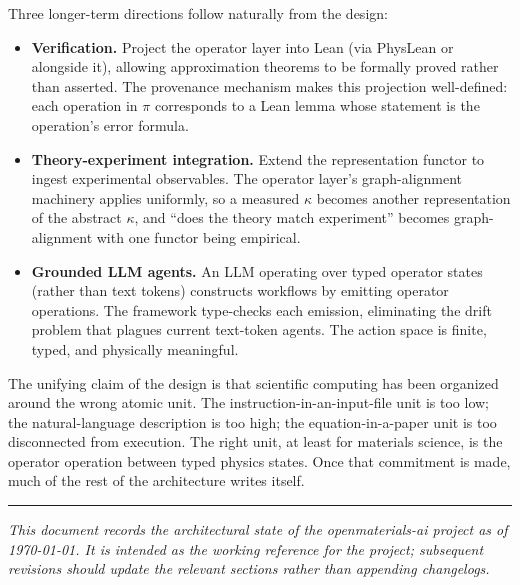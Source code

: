 \documentclass[11pt,a4paper]{article}
\begin{document}
Three longer-term directions follow naturally from the design:

\begin{itemize}[leftmargin=2em]
  \item \textbf{Verification.} Project the operator layer into Lean (via PhysLean or alongside
        it), allowing approximation theorems to be formally proved rather than asserted. The
        provenance mechanism makes this projection well-defined: each operation in $\pi$
        corresponds to a Lean lemma whose statement is the operation's error formula.
  \item \textbf{Theory-experiment integration.} Extend the representation functor to ingest
        experimental observables. The operator layer's graph-alignment machinery applies uniformly,
        so a measured $\kappa$ becomes another representation of the abstract $\kappa$, and
        ``does the theory match experiment'' becomes graph-alignment with one functor being
        empirical.
  \item \textbf{Grounded LLM agents.} An LLM operating over typed operator states (rather than
        text tokens) constructs workflows by emitting operator operations. The framework
        type-checks each emission, eliminating the drift problem that plagues current
        text-token agents. The action space is finite, typed, and physically meaningful.
\end{itemize}

The unifying claim of the design is that scientific computing has been organized around the
wrong atomic unit. The instruction-in-an-input-file unit is too low; the natural-language
description is too high; the equation-in-a-paper unit is too disconnected from execution. The
right unit, at least for materials science, is the operator operation between typed physics
states. Once that commitment is made, much of the rest of the architecture writes itself.

\bigskip
\hrule
\bigskip

\noindent\emph{This document records the architectural state of the openmaterials-ai project as
of \today. It is intended as the working reference for the project; subsequent revisions should
update the relevant sections rather than appending changelogs.}
\end{document}
